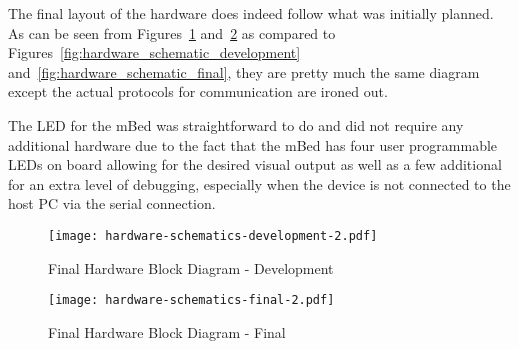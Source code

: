 
The final layout of the hardware does indeed follow what was initially planned. As can be seen from Figures~\ref{fig:hardware_schematic_development-2} and~\ref{fig:hardware_schematic_final-2} as compared to Figures~\ref{fig:hardware_schematic_development} and~\ref{fig:hardware_schematic_final}, they are pretty much the same diagram except the actual protocols for communication are ironed out. 

The LED for the mBed was straightforward to do and did not require any additional hardware due to the fact that the mBed has four user programmable LEDs on board allowing for the desired visual output as well as a few additional for an extra level of debugging, especially when the device is not connected to the host PC via the serial connection.

\begin{figure}
	\centering
	\texttt{[image: hardware-schematics-development-2.pdf]}
	\caption{Final Hardware Block Diagram - Development}
	\label{fig:hardware_schematic_development-2}
\end{figure}

\begin{figure}
	\centering
	\texttt{[image: hardware-schematics-final-2.pdf]}
	\caption{Final Hardware Block Diagram - Final}
	\label{fig:hardware_schematic_final-2}
\end{figure}